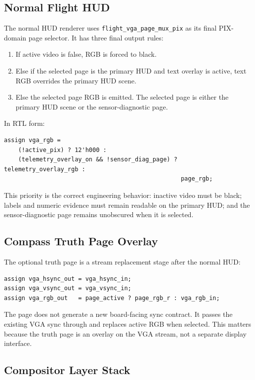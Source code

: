 \documentclass{article}
\newcommand{\file}[1]{\begingroup\nolinkurl{#1}\endgroup}
\begin{document}
\subsection{Normal Flight HUD}

The normal HUD renderer uses \file{flight_vga_page_mux_pix} as its final
PIX-domain page selector.  It has three final output rules:

\begin{enumerate}
  \item If active video is false, RGB is forced to black.
  \item Else if the selected page is the primary HUD and text overlay is active,
        text RGB overrides the primary HUD scene.
  \item Else the selected page RGB is emitted.  The selected page is either the
        primary HUD scene or the sensor-diagnostic page.
\end{enumerate}

In RTL form:

\begin{lstlisting}
assign vga_rgb =
    (!active_pix) ? 12'h000 :
    (telemetry_overlay_on && !sensor_diag_page) ? telemetry_overlay_rgb :
                                                  page_rgb;
\end{lstlisting}

This priority is the correct engineering behavior: inactive video must be
black; labels and numeric evidence must remain readable on the primary HUD; and
the sensor-diagnostic page remains unobscured when it is selected.

\subsection{Compass Truth Page Overlay}

The optional truth page is a stream replacement stage after the normal HUD:

\begin{lstlisting}
assign vga_hsync_out = vga_hsync_in;
assign vga_vsync_out = vga_vsync_in;
assign vga_rgb_out   = page_active ? page_rgb_r : vga_rgb_in;
\end{lstlisting}

The page does not generate a new board-facing sync contract.  It passes the
existing VGA sync through and replaces active RGB when selected.  This matters
because the truth page is an overlay on the VGA stream, not a separate display
interface.

\subsection{Compositor Layer Stack}
\end{document}

